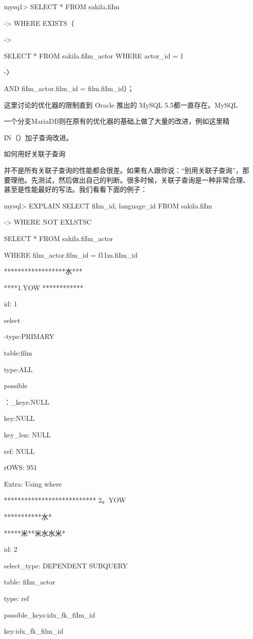 mysq1> SELECT * FROM sakila.fiIm

-> WHERE EXISTS（

->

SELECT * FROM sakila.fiIm\_actor WHERE actor\_id = 1

-〉

AND fiIm\_actor.film\_id = film.fiIm\_id）；

这里讨论的优化器的限制直到 Oracle 推出的 MySQL 5.5都一直存在。MySQL

一个分支MariaDB则在原有的优化器的基础上做了大量的改进，例如这里精

IN（）加子查询改进。

如何用好关联子查询

并不是所有关联子查询的性能都会很差。如果有人跟你说：“别用关联子查询”，那
要理他。先测试，然后做出自己的判断。很多时候，关联子查询是一种非常合理、
甚至是性能最好的写法。我们看看下面的例子：

mysql> EXPLAIN SELECT fiIm\_id, language\_id FROM sakila.fiIm

-> WHERE NOT EXLSTSC

SELECT * FROM sakila.fiIm\_actor

WHERE film\_actor.film\_id = f11m.fiIm\_id

******************水***

****1.YOW ************

id: 1

select

-type:PRIMARY

table:film

type:ALL

possible

：\_keys:NULL

key:NULL

key\_len: NULL

ref: NULL

rOWS: 951

Extra: Using where

*************************** 2。YOW

***********水*

*****米**米水水米*

id: 2

select\_type: DEPENDENT SUBQUERY

table: fiIm\_actor

type: ref

possible\_keys:idx\_fk\_fiIm\_id

key:idx\_fk\_film\_id

